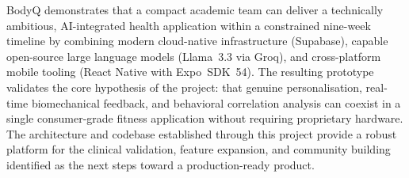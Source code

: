 BodyQ demonstrates that a compact academic team can deliver a technically
ambitious, AI-integrated health application within a constrained nine-week
timeline by combining modern cloud-native infrastructure (Supabase),
capable open-source large language models (Llama~3.3 via Groq), and
cross-platform mobile tooling (React Native with Expo~SDK~54). The
resulting prototype validates the core hypothesis of the project: that
genuine personalisation, real-time biomechanical feedback, and behavioral
correlation analysis can coexist in a single consumer-grade fitness
application without requiring proprietary hardware. The architecture and
codebase established through this project provide a robust platform for
the clinical validation, feature expansion, and community building
identified as the next steps toward a production-ready product.
